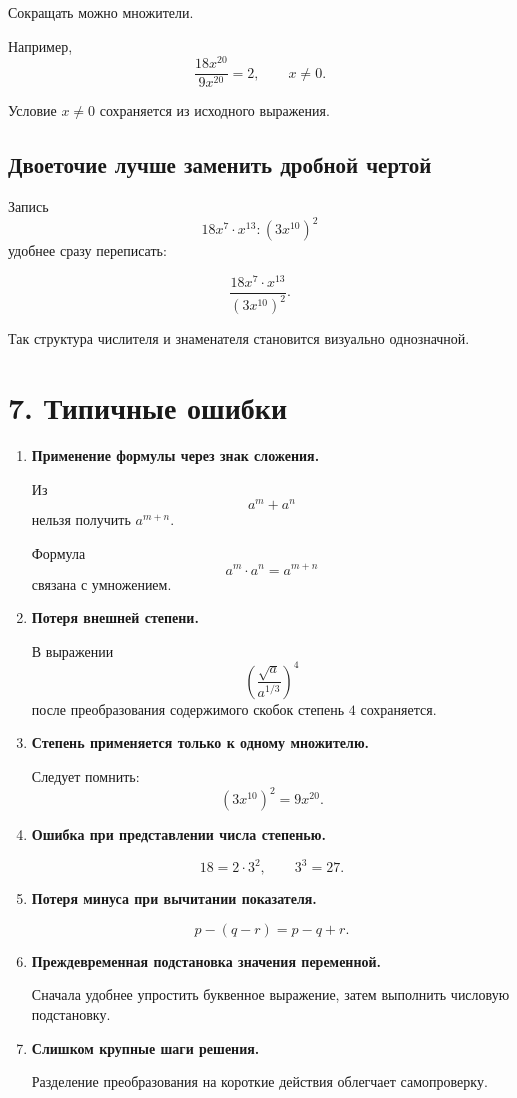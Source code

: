 \documentclass[a4paper,12pt]{article}
\begin{document}
Сокращать можно множители.

Например,
\[
\frac{18x^{20}}{9x^{20}}
=
2,
\qquad x\neq0.
\]

Условие \(x\neq0\) сохраняется из исходного выражения.

\subsection{Двоеточие лучше заменить дробной чертой}

Запись
\[
18x^7\cdot x^{13}:(3x^{10})^2
\]
удобнее сразу переписать:

\[
\frac{18x^7\cdot x^{13}}{(3x^{10})^2}.
\]

Так структура числителя и знаменателя становится визуально однозначной.

\section{7. Типичные ошибки}

\begin{enumerate}[label=\textbf{\arabic*)}]
  \item
  \textbf{Применение формулы через знак сложения.}

  Из
  \[
  a^m+a^n
  \]
  нельзя получить \(a^{m+n}\).

  Формула
  \[
  a^m\cdot a^n=a^{m+n}
  \]
  связана с умножением.

  \item
  \textbf{Потеря внешней степени.}

  В выражении
  \[
  \left(\frac{\sqrt a}{a^{1/3}}\right)^4
  \]
  после преобразования содержимого скобок степень \(4\) сохраняется.

  \item
  \textbf{Степень применяется только к одному множителю.}

  Следует помнить:
  \[
  (3x^{10})^2=9x^{20}.
  \]

  \item
  \textbf{Ошибка при представлении числа степенью.}

  \[
  18=2\cdot3^2,
  \qquad
  3^3=27.
  \]

  \item
  \textbf{Потеря минуса при вычитании показателя.}

  \[
  p-(q-r)=p-q+r.
  \]

  \item
  \textbf{Преждевременная подстановка значения переменной.}

  Сначала удобнее упростить буквенное выражение, затем выполнить числовую подстановку.

  \item
  \textbf{Слишком крупные шаги решения.}

  Разделение преобразования на короткие действия облегчает самопроверку.
\end{enumerate}
\end{document}
